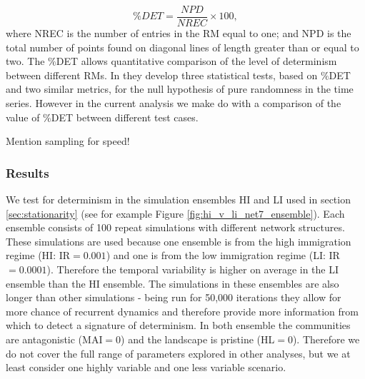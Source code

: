 \begin{equation}
\%DET = \frac{NPD}{NREC} \times 100,
\label{eq:pd}
\end{equation}
%
where NREC is the number of entries in the RM equal to one; and NPD is the total number of points found on diagonal lines of length greater than or equal to two. The $\%$DET allows quantitative comparison of the level of determinism between different RMs. In \cite{aparicio2008detecting} they develop three statistical tests, based on $\%$DET and two similar metrics, for the null hypothesis of pure randomness in the time series. However in the current analysis we make do with a comparison of the value of $\%$DET between different test cases.  



Mention sampling for speed! 

\subsubsection{Results}
\label{sec:rqa_results}

We test for determinism in the simulation ensembles HI and LI used in section \ref{sec:stationarity} (see for example Figure \ref{fig:hi_v_li_net7_ensemble}).  Each ensemble consists of 100 repeat simulations with different network structures. These simulations are used because one ensemble is from the high immigration regime (HI: IR$=0.001$) and one is from the low immigration regime (LI: IR$=0.0001$). Therefore the temporal variability is higher on average in the LI ensemble than the HI ensemble. The simulations in these ensembles are also longer than other simulations - being run for 50,000 iterations they allow for more chance of recurrent dynamics and therefore provide more information from which to detect a signature of determinism. In both ensemble the communities are antagonistic (MAI$=0$) and the landscape is pristine (HL$=0$). Therefore we do not cover the full range of parameters explored in other analyses, but we at least consider one highly variable and one less variable scenario.

